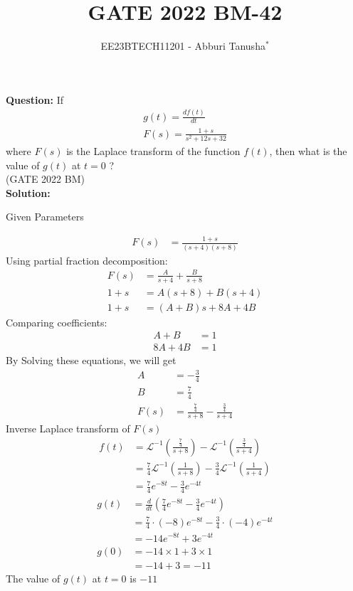 \documentclass[journal,12pt,twocolumn]{IEEEtran}
\theoremstyle{remark}
\begin{document}

\vspace{3cm}

\title{GATE 2022 BM-42}
\author{EE23BTECH11201 - Abburi Tanusha$^{*}$%
}
\maketitle
\newpage
\bigskip

\renewcommand{\thefigure}{\theenumi}
\renewcommand{\thetable}{\theenumi}

\vspace{3cm}

\maketitle
\textbf{Question:} 
If \begin{align*}
 g(t) = \frac{df(t)}{dt} \\
 F(s) = \frac{1+s}{s^2+12s+32} 
 \end{align*} where $F(s)$ is the Laplace transform of the function $f(t)$, then what is the value of $g(t)$ at $t=0$ ?\\
\hfill(GATE 2022 BM)\\
\textbf{Solution:} 
\begin{table}[h!]
\centering
\resizebox{6cm}{!}{

}
\caption{Given Parameters}
\label{tab:my_label}
\end{table}
\begin{align}
F(s) &= \frac{1+s}{(s+4)(s+8)}
\end{align}
Using partial fraction decomposition:
\begin{align}
F(s) &= \frac{A}{s+4} + \frac{B}{s+8} \\
1+s &= A(s+8) + B(s+4) \\
1+s &= (A+B)s + 8A + 4B
\end{align}
Comparing coefficients:
\begin{align}
A+B &= 1 \\
8A + 4B &= 1
\end{align}
By Solving these equations, we will get
 \begin{align}
  A &= -\frac{3}{4} \\
  B &= \frac{7}{4}  \\
F(s) &= \frac{\frac{7}{4}}{s+8} - \frac{\frac{3}{4}}{s+4} 
\end{align}
Inverse Laplace transform of $F(s)$ 
\begin{align}
f(t) &= \mathcal{L}^{-1}\left(\frac{\frac{7}{4}}{s+8}\right) - \mathcal{L}^{-1}\left(\frac{\frac{3}{4}}{s+4}\right) \\
&= \frac{7}{4}\mathcal{L}^{-1}\left(\frac{1}{s+8}\right) - \frac{3}{4}\mathcal{L}^{-1}\left(\frac{1}{s+4}\right) \\
&= \frac{7}{4}e^{-8t} - \frac{3}{4}e^{-4t}
\end{align}
\begin{align}
g(t) &= \frac{d}{dt}\left(\frac{7}{4}e^{-8t} - \frac{3}{4}e^{-4t}\right) \\
&= \frac{7}{4}\cdot(-8)e^{-8t} - \frac{3}{4}\cdot(-4)e^{-4t} \\
&= -14e^{-8t} + 3e^{-4t} \\
g(0) &= -14 \times 1 + 3 \times 1 \\
&= -14 + 3 = -11
\end{align}
The value of $g(t)$ at $t = 0$ is $-11$ \\
\end{document}
